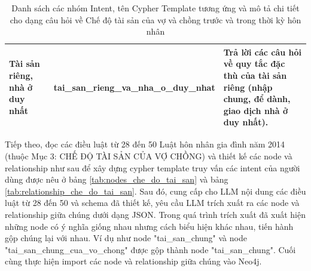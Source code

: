 \documentclass[../DoAn.tex]{subfiles}
\begin{document}
\begin{table}[htbp]
\begin{tabularx}{\textwidth}{|>{\raggedright\arraybackslash}p{2.5cm}|>{\raggedright\arraybackslash}p{4.1cm}|>{\raggedright\arraybackslash}X|}
Tài sản riêng, nhà ở duy nhất &
tai\_\allowbreak san\_\allowbreak rieng\_\allowbreak va\_\allowbreak nha\_\allowbreak o\_\allowbreak duy\_\allowbreak nhat &
Trả lời các câu hỏi về quy tắc đặc thù của tài sản riêng (nhập chung, để dành, giao dịch nhà ở duy nhất). \\ \hline
\end{tabularx}
\caption{Danh sách các nhóm Intent, tên Cypher Template tương ứng và mô tả chi tiết cho dạng câu hỏi về Chế độ tài sản của vợ và chồng trước và trong thời kỳ hôn nhân}
\label{tab:intent_che_do_tai_san}
\end{table}

Tiếp theo, đọc các điều luật từ 28 đến 50 Luật hôn nhân gia đình năm 2014 (thuộc Mục 3: CHẾ ĐỘ TÀI SẢN CỦA VỢ CHỒNG) và thiết kế các node và relationship như sau để xây dựng cypher template truy vấn các intent của người dùng được nêu ở bảng \ref{tab:nodes_che_do_tai_san} và bảng \ref{tab:relationship_che_do_tai_san}. Sau đó, cung cấp cho LLM nội dung các điều luật từ 28 đến 50 và schema đã thiết kế, yêu cầu LLM trích xuất ra các node và relationship giữa chúng dưới dạng JSON. Trong quá trình trích xuất đã xuất hiện những node có ý nghĩa giống nhau nhưng cách biểu hiện khác nhau, tiến hành gộp chúng lại với nhau. Ví dụ như node "tai\_\allowbreak san\_\allowbreak chung" và node "tai\_\allowbreak san\_\allowbreak chung\_\allowbreak cua\_\allowbreak vo\_\allowbreak chong" được gộp thành node "tai\_\allowbreak san\_\allowbreak chung". Cuối cùng thực hiện import các node và relationship giữa chúng vào Neo4j.
\end{document}
